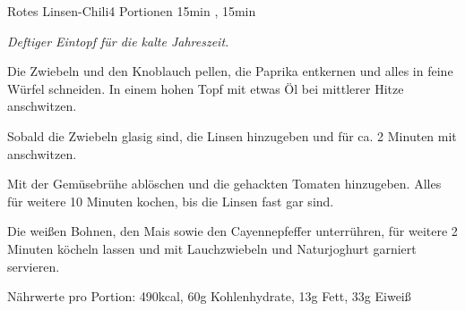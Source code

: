 \documentclass[../recipe-collections/cooking.tex]{subfiles}
\begin{document}
\begin{recipe}{Rotes Linsen-Chili}{4 Portionen }{15min , 15min }

  \freeform{}\textit{Deftiger Eintopf für die kalte Jahreszeit.}


  Die Zwiebeln und den Knoblauch pellen, die Paprika entkernen und alles in feine Würfel schneiden.
  In einem hohen Topf mit etwas Öl bei mittlerer Hitze anschwitzen.


  Sobald die Zwiebeln glasig sind, die Linsen hinzugeben und für ca. 2 Minuten mit anschwitzen.


  Mit der Gemüsebrühe ablöschen und die gehackten Tomaten hinzugeben.
  Alles für weitere 10 Minuten kochen, bis die Linsen fast gar sind.


  Die weißen Bohnen, den Mais sowie den Cayennepfeffer unterrühren, für weitere 2 Minuten köcheln lassen und mit Lauchzwiebeln und Naturjoghurt garniert servieren.

  \freeform{}\hrulefill{}

  \freeform{}
  Nährwerte pro Portion: 490kcal, 60g Kohlenhydrate, 13g Fett, 33g Eiweiß

\end{recipe}
\end{document}
